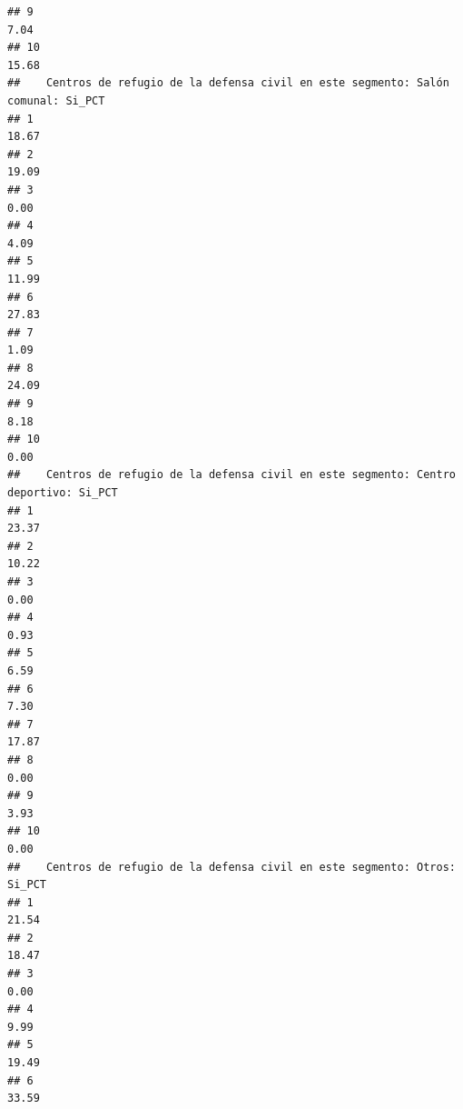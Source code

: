 \documentclass[11pt,]{article}
\begin{document}
\begin{verbatim}
## 9                                                                      7.04
## 10                                                                    15.68
##    Centros de refugio de la defensa civil en este segmento: Salón comunal: Si_PCT
## 1                                                                           18.67
## 2                                                                           19.09
## 3                                                                            0.00
## 4                                                                            4.09
## 5                                                                           11.99
## 6                                                                           27.83
## 7                                                                            1.09
## 8                                                                           24.09
## 9                                                                            8.18
## 10                                                                           0.00
##    Centros de refugio de la defensa civil en este segmento: Centro deportivo: Si_PCT
## 1                                                                              23.37
## 2                                                                              10.22
## 3                                                                               0.00
## 4                                                                               0.93
## 5                                                                               6.59
## 6                                                                               7.30
## 7                                                                              17.87
## 8                                                                               0.00
## 9                                                                               3.93
## 10                                                                              0.00
##    Centros de refugio de la defensa civil en este segmento: Otros: Si_PCT
## 1                                                                   21.54
## 2                                                                   18.47
## 3                                                                    0.00
## 4                                                                    9.99
## 5                                                                   19.49
## 6                                                                   33.59

\end{verbatim}
\end{document}

